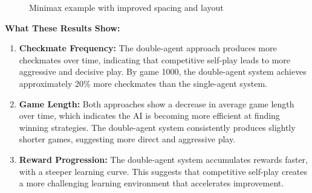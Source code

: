\documentclass[11pt]{article}
\begin{document}
\begin{figure}[ht]
    \centering
    \caption{Minimax example with improved spacing and layout}
    \label{fig:minimax_example}
\end{figure}

\textbf{What These Results Show:}

\begin{enumerate}
    \item \textbf{Checkmate Frequency:} The double-agent approach produces more checkmates over time, indicating that competitive self-play leads to more aggressive and decisive play. By game 1000, the double-agent system achieves approximately 20\% more checkmates than the single-agent system.
    
    \item \textbf{Game Length:} Both approaches show a decrease in average game length over time, which indicates the AI is becoming more efficient at finding winning strategies. The double-agent system consistently produces slightly shorter games, suggesting more direct and aggressive play.
    
    \item \textbf{Reward Progression:} The double-agent system accumulates rewards faster, with a steeper learning curve. This suggests that competitive self-play creates a more challenging learning environment that accelerates improvement.
\end{enumerate}
\end{document}
